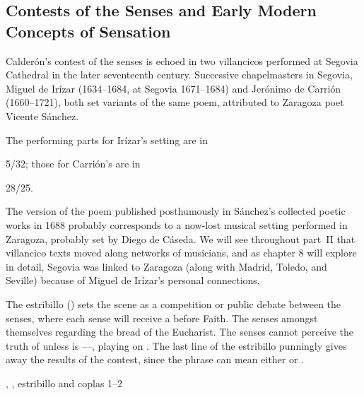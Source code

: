 \subsection{Contests of the Senses and Early Modern Concepts of Sensation}

Calderón's contest of the senses is echoed in two villancicos performed at Segovia Cathedral in the later seventeenth century.
Successive chapelmasters in Segovia, Miguel de Irízar (1634--1684, at Segovia 1671--1684) and Jerónimo de Carrión (1660--1721), both set variants of the same poem, attributed to Zaragoza poet Vicente Sánchez.%
  \begin{Footnote}
  The performing parts for Irízar's setting are in \signature{E-SE}{5/32}; those for Carrión's are in \signature{E-SE}{28/25}.
  \end{Footnote}
The version of the poem published posthumously in Sánchez's collected poetic works in 1688 probably corresponds to a now-lost musical setting performed in Zaragoza, probably set by Diego de Cáseda.%
  \autocite[171--172]{Sanchez:LiraPoetica}
We will see throughout part~II that villancico texts moved along networks of musicians, and as chapter 8 will explore in detail, Segovia was linked to Zaragoza (along with Madrid, Toledo, and Seville) because of Miguel de Irízar's personal connections.

The estribillo () sets the scene as a competition or public debate between the senses, where each sense will receive a  before Faith.
The senses  amongst themselves regarding the bread of the Eucharist.
The senses cannot perceive the truth of  unless  is ---, playing on .
The last line of the estribillo punningly gives away the results of the contest, since the phrase  can mean either  or .

\begin{expoem}
\caption{, , estribillo and coplas 1--2}
\label{expoem:Si_los_sentidos-Sanchez-estribillo}
\end{expoem}

